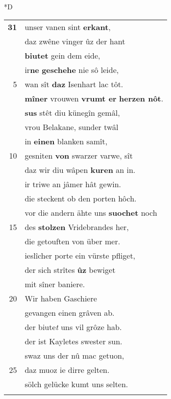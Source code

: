 \documentclass[8pt,a4paper,notitlepage]{article}
\begin{document}
\begin{table}[ht]
\begin{minipage}[t]{0.5\linewidth}
\small
\begin{center}*D
\end{center}
\begin{tabular}{rl}
\textbf{31} & unser vanen sint \textbf{erkant},\\ 
 & daz zwêne vinger ûz der hant\\ 
 & \textbf{biutet} gein dem eide,\\ 
 & ir\textbf{ne} \textbf{geschehe} nie sô leide,\\ 
5 & wan sît \textbf{daz} Isenhart lac tôt.\\ 
 & \textbf{mîner} vrouwen \textbf{vrumt er} \textbf{herzen nôt}.\\ 
 & \textbf{sus} stêt diu künegîn gemâl,\\ 
 & vrou Belakane, sunder twâl\\ 
 & in \textbf{einen} blanken samît,\\ 
10 & gesniten \textbf{von} swarzer varwe, sît\\ 
 & daz wir diu wâpen \textbf{kuren} an in.\\ 
 & ir triwe an jâmer hât gewin.\\ 
 & die steckent ob den porten hôch.\\ 
 & vor die andern ähte uns \textbf{suochet} noch\\ 
15 & des \textbf{stolzen} Vridebrandes her,\\ 
 & die getouften von über mer.\\ 
 & ieslîcher porte ein vürste pfliget,\\ 
 & der sich strîtes \textbf{ûz} bewiget\\ 
 & mit sîner baniere.\\ 
20 & Wir haben Gaschiere\\ 
 & gevangen einen grâven ab.\\ 
 & der biute\textit{t} uns vil grôze hab.\\ 
 & der ist Kayletes swester sun.\\ 
 & swaz uns der nû mac getuon,\\ 
25 & daz muoz ie dirre gelten.\\ 
 & sölch gelücke kumt uns selten.\\ 
 & \textit{\begin{large}G\end{large}}rüenes angers \textbf{lützel}, sandes\\ 

\end{tabular}
\end{minipage}
\end{table}
\end{document}
